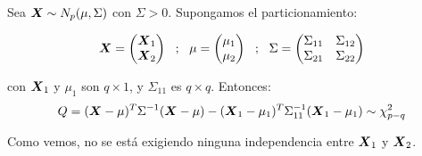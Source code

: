 \begin{nth}
  Sea $\boldsymbol{X} \sim N_p(\mu,\Sigma)$ con $\Sigma > 0$. Supongamos el particionamiento:
  
 \[
   \boldsymbol{X} = \begin{pmatrix} \boldsymbol{X}_1 \\ \boldsymbol{X}_2 \end{pmatrix} \ \ ; \ \ \mu = \begin{pmatrix} \mu_1 \\ \mu_2 \end{pmatrix} \ \ ; \ \ \Sigma = \begin{pmatrix} \Sigma_{11} & \Sigma_{12} \\ \Sigma_{21} & \Sigma_{22} \end{pmatrix}
  \]
  
  con $\boldsymbol{X}_1$ y $\mu_1$ son $q\times 1$, y $\Sigma_{11}$ es $q\times q$. Entonces:
  \[
  Q = (\boldsymbol{X}- \mu)^T\Sigma^{-1}(\boldsymbol{X} - \mu) - (\boldsymbol{X}_1-\mu_1)^T \Sigma_{11}^{-1}(\boldsymbol{X}_1-\mu_1) \sim \chi^2_{p-q}
  \]
  \end{nth}
\begin{nota}
Como vemos, no se está exigiendo ninguna independencia entre $\boldsymbol{X}_1$ y $\boldsymbol{X}_2$.
\end{nota}
